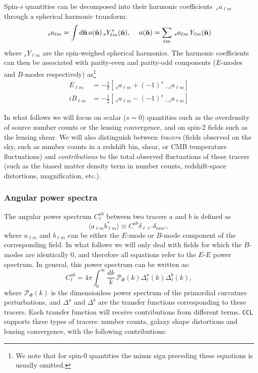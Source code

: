 \documentclass[\docopts]{\docclass}
\newcommand{\nv}{\hat{\bf n}}
\newcommand{\ccl}{{\tt CCL}\xspace}
\begin{document}
Spin-$s$ quantities can be decomposed into their harmonic coefficients $\,_sa_{\ell m}$ through a spherical harmonic transform:
\begin{equation}\nonumber
  \,_sa_{\ell m}=\int d\nv\,a(\nv)\,_sY^*_{\ell m}(\nv),\hspace{12pt}
  a(\nv)=\sum_{\ell m}\,_sa_{\ell m}\,Y_{\ell m}(\nv)
\end{equation}
where $_sY_{\ell m}$ are the spin-weighed spherical harmonics. The harmonic coefficients can then be associated with parity-even and parity-odd components ($E$-modes and $B$-modes respectively) as\footnote{We note that for spin-$0$ quantities the minus sign preceding these equations is usually omitted.}
\begin{align}\nonumber
   E_{\ell m}&=-\frac{1}{2}\left[\,_{s}a_{\ell m}+(-1)^s\,_{-s}a_{\ell m}\right]\\
  iB_{\ell m}&=-\frac{1}{2}\left[\,_{s}a_{\ell m}-(-1)^s\,_{-s}a_{\ell m}\right]
\end{align}

In what follows we will focus on scalar ($s=0$) quantities such as the overdensity of source number counts or the lensing convergence, and on spin-2 fields such as the lensing shear. We will also distinguish between {\sl tracers} (fields observed on the sky, such as number counts in a redshift bin, shear, or CMB temperature fluctuations) and {\sl contributions} to the total observed fluctuations of these tracers (such as the biased matter density term in number counts, redshift-space distortions, magnification, etc.).

\subsubsection{Angular power spectra}\label{sssec:2pt.pspec}

The angular power spectrum $C^{ab}_\ell$ between two tracers $a$ and $b$ is defined as
\begin{equation}
  \langle a_{\ell m}b^*_{\ell m}\rangle\equiv C^{ab}\delta_{\ell\ell'}\delta_{mm'},
\end{equation}
where $a_{\ell m}$ and $b_{\ell m}$ can be either the $E$-mode or $B$-mode component of the corresponding field. In what follows we will only deal with fields for which the $B$-modes are identically $0$, and therefore all equations refer to the $E$-$E$ power spectrum. In general, this power spectrum can be written as:
\begin{equation}
  C^{ab}_\ell=4\pi\int_0^\infty \frac{dk}{k}\,\mathcal{P}_\Phi(k)\Delta^a_\ell(k)\Delta^b_\ell(k),
  \label{eq:cls}
\end{equation}
where $\mathcal{P}_\Phi(k)$ is the dimensionless power spectrum of the primordial curvature perturbations, and $\Delta^a$ and $\Delta^b$ are the transfer functions corresponding to these tracers. Each transfer function will receive contributions from different terms. \ccl supports three types of tracers: number counts, galaxy shape distortions and lensing convergence, with the following contributions:
\end{document}
